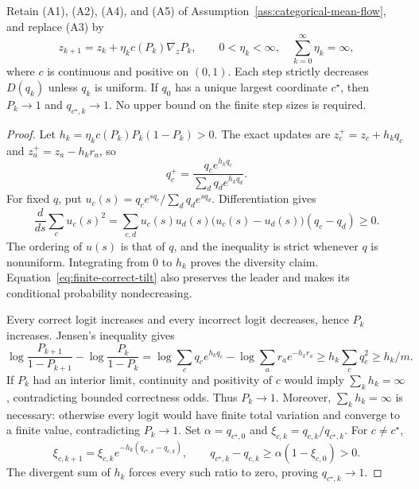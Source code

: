 \begin{theorem}
\enforcehalffinalproseline
\label{thm:finite-expected-steps}
Retain (A1), (A2), (A4), and (A5) of
Assumption~\ref{ass:categorical-mean-flow}, and replace (A3) by
\begin{equation}
 z_{k+1}=z_k+\eta_k c(P_k)\nabla_zP_k,
 \qquad 0<\eta_k<\infty,\quad \sum_{k=0}^\infty\eta_k=\infty,
 \label{eq:finite-expected-update}
\end{equation}
where $c$ is continuous and positive on $(0,1)$. Each step strictly decreases
$D(q_k)$ unless $q_k$ is uniform. If $q_0$ has a unique largest coordinate
$c^\star$, then $P_k\to1$ and $q_{c^\star,k}\to1$.
No upper bound on the finite step sizes is required.
\end{theorem}

\begin{proof}
\enforcehalffinalproseline
Let $h_k=\eta_kc(P_k)P_k(1-P_k)>0$. The exact updates are
$z_c^+=z_c+h_kq_c$ and $z_a^+=z_a-h_kr_a$, so
\begin{equation}
 q_c^+=\frac{q_c e^{h_kq_c}}{\sum_dq_d e^{h_kq_d}}.
 \label{eq:finite-correct-tilt}
\end{equation}
For fixed $q$, put $u_c(s)=q_ce^{sq_c}/\sum_dq_de^{sq_d}$.
Differentiation gives
\[
 \frac{d}{ds}\sum_cu_c(s)^2
 =\sum_{c,d}u_c(s)u_d(s)
       \big(u_c(s)-u_d(s)\big)(q_c-q_d)\ge0.
\]
The ordering of $u(s)$ is that of $q$, and the inequality is strict whenever
$q$ is nonuniform. Integrating from $0$ to $h_k$ proves the diversity claim.
Equation~\eqref{eq:finite-correct-tilt} also preserves the leader and makes
its conditional probability nondecreasing.

Every correct logit increases and every incorrect logit decreases, hence
$P_k$ increases. Jensen's inequality gives
\[
 \log\frac{P_{k+1}}{1-P_{k+1}}-\log\frac{P_k}{1-P_k}
 =\log\sum_cq_c e^{h_kq_c}-\log\sum_ar_a e^{-h_kr_a}
 \ge h_k\sum_cq_c^2\ge h_k/m.
\]
If $P_k$ had an interior limit, continuity and positivity of $c$ would imply
$\sum_kh_k=\infty$, contradicting bounded correctness odds. Thus $P_k\to1$.
Moreover, $\sum_kh_k=\infty$ is necessary: otherwise every logit would have
finite total variation and converge to a finite value, contradicting
$P_k\to1$.
Set $\alpha=q_{c^\star,0}$ and
$\xi_{c,k}=q_{c,k}/q_{c^\star,k}$. For $c\ne c^\star$,
\[
 \xi_{c,k+1}=\xi_{c,k}
  e^{-h_k(q_{c^\star,k}-q_{c,k})},
 \qquad
 q_{c^\star,k}-q_{c,k}
 \ge\alpha(1-\xi_{c,0})>0.
\]
The divergent sum of $h_k$ forces every such ratio to zero, proving
$q_{c^\star,k}\to1$.
\end{proof}

